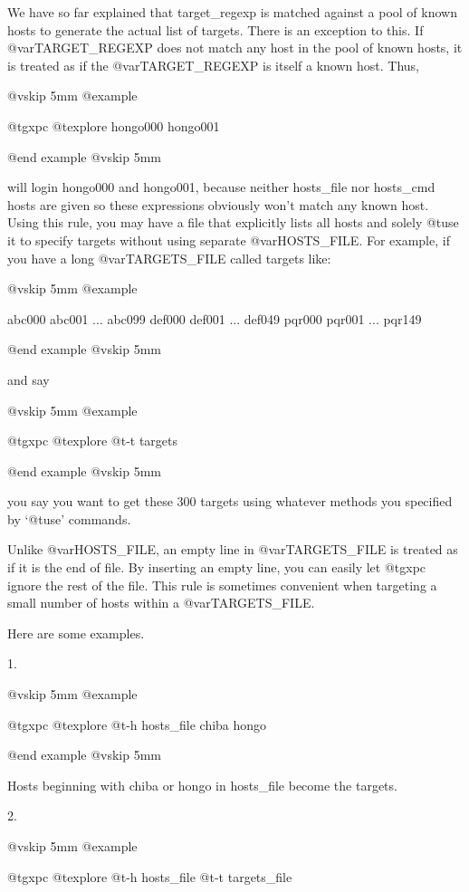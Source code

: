 We have so far explained that target_regexp is matched against a
pool of known hosts to generate the actual list of targets.
There is an exception to this. If @var{TARGET_REGEXP} does not match
any host in the pool of known hosts, it is treated as if the
@var{TARGET_REGEXP} is itself a known host. Thus,

@vskip 5mm
@example

  @t{gxpc} @t{explore} hongo000 hongo001

@end example
@vskip 5mm

will login hongo000 and hongo001, because neither hosts_file nor
hosts_cmd hosts are given so these expressions obviously won't
match any known host. Using this rule, you may have a file that
explicitly lists all hosts and solely @t{use} it to specify targets
without using separate @var{HOSTS_FILE}. For example, if you have a
long @var{TARGETS_FILE} called targets like:

@vskip 5mm
@example

  abc000
  abc001
    ...
  abc099
  def000
  def001
    ...
  def049
  pqr000
  pqr001
    ...
  pqr149

@end example
@vskip 5mm

and say

@vskip 5mm
@example

  @t{gxpc} @t{explore} @t{-t} targets

@end example
@vskip 5mm

you say you want to get these 300 targets using whatever methods
you specified by `@t{use}' commands.

Unlike @var{HOSTS_FILE}, an empty line in @var{TARGETS_FILE} is treated as if
it is the end of file. By inserting an empty line, you can easily
let @t{gxpc} ignore the rest of the file. This rule is sometimes
convenient when targeting a small number of hosts within a
@var{TARGETS_FILE}.

Here are some examples.

1.

@vskip 5mm
@example

  @t{gxpc} @t{explore} @t{-h} hosts_file chiba hongo

@end example
@vskip 5mm

Hosts beginning with chiba or hongo in hosts_file 
become the targets.

2.

@vskip 5mm
@example

  @t{gxpc} @t{explore} @t{-h} hosts_file @t{-t} targets_file

